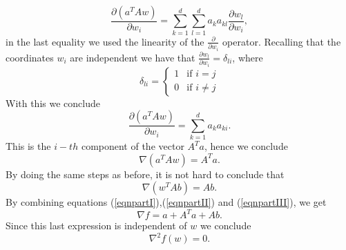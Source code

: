 \documentclass{article}
\begin{document}
\begin{equation*}
\frac{\partial(a^{T}Aw)}{\partial w_{i}}=\sum_{k=1}^{d}\sum_{l=1}^{d}a_{k}a_{kl}\frac{\partial w_{l}}{\partial w_{i}},
\end{equation*}
in the last equality we used the linearity of the $\frac{\partial}{\partial w_{i}}$ operator. Recalling that the coordinates $w_{i}$ 
are independent we have that $\frac{\partial w_{l}}{\partial w_{i}}=\delta_{li}$, where 
\begin{equation*}
\delta_{li}=\left\{
		\begin{array}{ll}
			1 &\mbox{if } i=j \\
			0 &\mbox{if } i\neq j
		\end{array}
	\right.
\end{equation*}
With this we conclude
\begin{equation*}
\frac{\partial(a^{T}Aw)}{\partial w_{i}}=\sum_{k=1}^{d}a_{k}a_{ki}.
\end{equation*}
This is the $i-th$ component of the vector $A^{T}a$, hence we conclude
\begin{equation}\label{eqnpartII}
\nabla(a^{T}Aw)=A^{T}a.
\end{equation}
By doing the same steps as before, it is not hard to conclude that 
\begin{equation}\label{eqnpartIII}
\nabla(w^{T}Ab)=Ab.
\end{equation}
By combining equations (\ref{eqnpartI}),(\ref{eqnpartII}) and (\ref{eqnpartIII}), we get
\begin{equation*}
\nabla f=a+A^{T}a+Ab.
\end{equation*}
Since this last expression is independent of $w$ we conclude
\begin{equation*}
\nabla^{2}f(w)=0.
\end{equation*}
\end{document}
